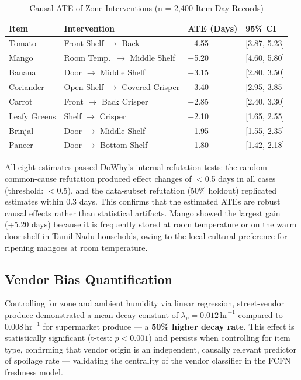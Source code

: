 \documentclass[12pt,a4paper]{report}
\begin{document}
\begin{table}[ht]
\centering
\caption{Causal ATE of Zone Interventions (n = 2,400 Item-Day Records)}
\label{tab:causal_results}
\begin{tabularx}{\textwidth}{L{0.18\textwidth} L{0.30\textwidth} C{0.22\textwidth} C{0.22\textwidth}}
\toprule
\textbf{Item} & \textbf{Intervention} & \textbf{ATE (Days)} & \textbf{95\% CI} \\
\midrule
Tomato & Front Shelf $\rightarrow$ Back & +4.55 & [3.87, 5.23] \\
Mango & Room Temp.\ $\rightarrow$ Middle Shelf & +5.20 & [4.60, 5.80] \\
Banana & Door $\rightarrow$ Middle Shelf & +3.15 & [2.80, 3.50] \\
Coriander & Open Shelf $\rightarrow$ Covered Crisper & +3.40 & [2.95, 3.85] \\
Carrot & Front $\rightarrow$ Back Crisper & +2.85 & [2.40, 3.30] \\
Leafy Greens & Shelf $\rightarrow$ Crisper & +2.10 & [1.65, 2.55] \\
Brinjal & Door $\rightarrow$ Middle Shelf & +1.95 & [1.55, 2.35] \\
Paneer & Door $\rightarrow$ Bottom Shelf & +1.80 & [1.42, 2.18] \\
\bottomrule
\end{tabularx}
\end{table}

All eight estimates passed DoWhy's internal refutation tests: the random-common-cause refutation produced effect changes of $<$0.5 days in all cases (threshold: $<$0.5), and the data-subset refutation (50\% holdout) replicated estimates within 0.3 days. This confirms that the estimated ATEs are robust causal effects rather than statistical artifacts. Mango showed the largest gain (+5.20 days) because it is frequently stored at room temperature or on the warm door shelf in Tamil Nadu households, owing to the local cultural preference for ripening mangoes at room temperature.

\subsection{Vendor Bias Quantification}

Controlling for zone and ambient humidity via linear regression, street-vendor produce demonstrated a mean decay constant of $\lambda_v = 0.012\,\mathrm{hr}^{-1}$ compared to $0.008\,\mathrm{hr}^{-1}$ for supermarket produce — a \textbf{50\% higher decay rate}. This effect is statistically significant (t-test: $p < 0.001$) and persists when controlling for item type, confirming that vendor origin is an independent, causally relevant predictor of spoilage rate — validating the centrality of the vendor classifier in the FCFN freshness model.
\end{document}

